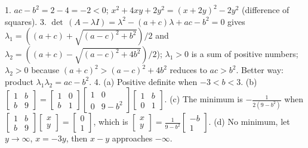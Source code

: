 1. \(ac-b^{2}=2-4=-2<0\); \(x^{2}+4xy+2y^{2}=(x+2y)^{2}-2y^{2}\) (difference of squares).
3. \(\det\,(A-\lambda I)=\lambda^{2}-(a+c)\lambda+ac-b^{2}=0\) gives \(\lambda_{1}=((a+c)+\sqrt{(a-c)^{2}+b^{2}})/2\) and \(\lambda_{2}=((a+c)-\sqrt{(a-c)^{2}+4b^{2}})/2\)); \(\lambda_{1}>0\) is a sum of positive numbers; \(\lambda_{2}>0\) because \((a+c)^{2}>(a-c)^{2}+4b^{2}\) reduces to \(ac>b^{2}\). Better way: product \(\lambda_{1}\lambda_{2}=ac-b^{2}\).
4. (a) Positive definite when \(-3<b<3\). (b) \(\begin{bmatrix}1&b\\ b&9\end{bmatrix}=\begin{bmatrix}1&0\\ b&1\end{bmatrix}\begin{bmatrix}1&0\\ 0&9-b^{2}\end{bmatrix}\begin{bmatrix}1&b\\ 0&1\end{bmatrix}\). (c) The minimum is \(-\frac{1}{2(9-b^{2})}\) when \(\begin{bmatrix}1&b\\ b&9\end{bmatrix}\begin{bmatrix}x\\ y\end{bmatrix}=\begin{bmatrix}0\\ 1\end{bmatrix}\), which is \(\begin{bmatrix}x\\ y\end{bmatrix}=\frac{1}{9-b^{2}}\begin{bmatrix}-b\\ 1\end{bmatrix}\). (d) No minimum, let \(y\to\infty\), \(x=-3y\), then \(x-y\) approaches \(-\infty\).

 